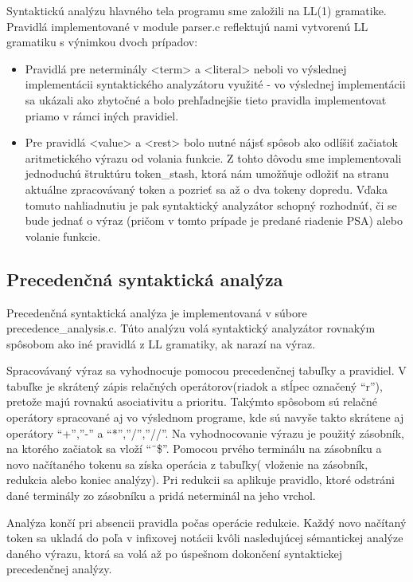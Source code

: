 \documentclass{article}
\begin{document}
	Syntaktickú analýzu hlavného tela programu sme založili na LL(1) gramatike. Pravidlá implementované v module parser.c reflektujú nami vytvorenú LL gramatiku s výnimkou dvoch prípadov:
	\begin{itemize}
	\item Pravidlá pre neterminály <term> a <literal> neboli vo výslednej implementácii syntaktického analyzátoru využité - vo výslednej implementácii sa ukázali ako zbytočné a bolo prehľadnejšie tieto pravidla implementovat priamo v rámci iných pravidiel.
	
	\item Pre pravidlá <value> a <rest> bolo nutné nájsť spôsob ako odlíšiť začiatok aritmetického výrazu od volania funkcie. Z tohto dôvodu sme implementovali jednoduchú štruktúru token\_stash, ktorá nám umožňuje odložiť na stranu aktuálne zpracovávaný token a pozrieť sa až o dva tokeny dopredu. Vďaka tomuto nahliadnutiu je pak syntaktický analyzátor schopný rozhodnúť, či se bude jednať o výraz (pričom v tomto prípade je predané riadenie PSA) alebo volanie funkcie.
    \end{itemize}

	\subsection{Precedenčná syntaktická analýza}
	Precedenčná syntaktická analýza je implementovaná v súbore precedence\_analysis.c. Túto analýzu volá syntaktický analyzátor rovnakým spôsobom ako iné pravidlá z LL gramatiky, ak narazí na výraz.
	
	Spracovávaný výraz sa vyhodnocuje pomocou precedenčnej tabuľky a pravidiel. V tabuľke je skrátený zápis relačných operátorov(riadok a stĺpec označený “r”), pretože majú rovnakú asociativitu a prioritu. Takýmto spôsobom sú relačné operátory spracované aj vo výslednom programe, kde sú navyše takto skrátene aj operátory “+”,”-” a “*”,”/”,”//”. Na vyhodnocovanie výrazu je použitý zásobník, na ktorého začiatok sa vloží “¨\$”. Pomocou prvého terminálu na zásobníku a novo načítaného tokenu sa získa operácia z tabuľky( vloženie na zásobník, redukcia alebo koniec analýzy). Pri redukcii sa aplikuje  pravidlo, ktoré odstráni dané terminály zo zásobníku a pridá neterminál na jeho vrchol.
	
	Analýza končí pri absencii pravidla počas operácie redukcie. Každý novo načítaný token sa ukladá do poľa v infixovej notácii kvôli nasledujúcej sémantickej analýze daného výrazu, ktorá sa volá až po úspešnom dokončení syntaktickej precedenčnej analýzy.
	
\end{document}

